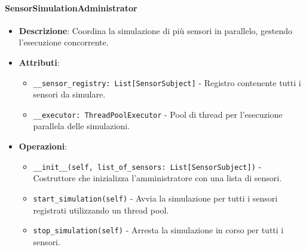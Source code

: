 \documentclass[10pt]{article}
\begin{document}
    \paragraph{SensorSimulationAdministrator}
    \begin{itemize}
        \item \textbf{Descrizione}: Coordina la simulazione di più sensori in parallelo, gestendo l'esecuzione concorrente.
        \item \textbf{Attributi}:
        \begin{itemize}
            \item \texttt{\_\_sensor\_registry: List[SensorSubject]} - Registro contenente tutti i sensori da simulare.
            \item \texttt{\_\_executor: ThreadPoolExecutor} - Pool di thread per l'esecuzione parallela delle simulazioni.
        \end{itemize}
        \item \textbf{Operazioni}:
        \begin{itemize}
            \item \texttt{\_\_init\_\_(self, list\_of\_sensors: List[SensorSubject])} - Costruttore che inizializza l'amministratore con una lista di sensori.
            \item \texttt{start\_simulation(self)} - Avvia la simulazione per tutti i sensori registrati utilizzando un thread pool.
            \item \texttt{stop\_simulation(self)} - Arresta la simulazione in corso per tutti i sensori.
        \end{itemize}
    \end{itemize}
\end{document}
